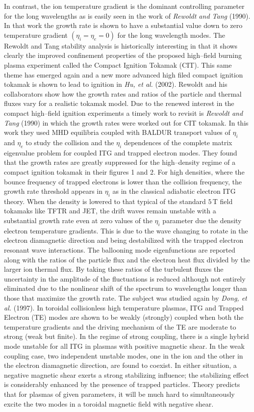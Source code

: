 \documentclass[a4paper,openany,12pt]{book}
\begin{document}
In contrast, the ion temperature gradient is the dominant controlling parameter for the long wavelengths as is easily seen in the work of \emph{Rewoldt and Tang} (1990). In that work the growth rate is shown to have a substantial value down to zero temperature gradient $(\eta_i=\eta_e=0)$ for the long wavelength modes. The Rewoldt and Tang stability analysis is historically interesting in that it shows clearly the improved confinement properties of the proposed high--field burning plasma experiment called the Compact Ignition Tokamak (CIT). This same theme has emerged again and a new more advanced high filed compact ignition tokamak is shown to lead to ignition in \emph{Hu, et al.} (2002). Rewoldt and his collaborators show how the growth rates and ratios of the particle and thermal fluxes vary for a realistic tokamak model. Due to the renewed interest in the compact high--field ignition experiments a timely work to revisit is \emph{Rewoldt and Tang} (1990) in which the growth rates were worked out for CIT tokamak. In this work they used MHD equilibria coupled with BALDUR transport values of $\eta_i$ and $\eta_e$ to study the collision and the $\eta_i$ dependences of the complete matrix eigenvalue problem for coupled ITG and trapped electron modes. They found that the growth rates are greatly suppressed for the high--density regime of a compact ignition tokamak in their figures 1 and 2. For high densities, where the bounce frequency of trapped electrons is lower than the collision frequency, the growth rate threshold appears in $\eta_i$ as in the classical adiabatic electron ITG theory. When the density is lowered to that typical of the standard 
$5\,$T field tokamaks like TFTR and JET, the drift waves remain unstable with a substantial growth rate even at zero values of the $\eta_i$ parameter due the density electron temperature gradients. This is due to the wave changing to rotate in the electron diamagnetic direction and being destabilized with the trapped electron resonant wave interactions. The ballooning mode eigenfunctions are reported along with the ratios of the particle flux and the electron heat flux divided by the larger ion thermal flux. By taking these ratios of the turbulent fluxes the uncertainty in the amplitude of the fluctuations is reduced although not entirely eliminated due to the nonlinear shift of the spectrum to wavelengths longer than those that maximize the growth rate. The subject was studied again by \emph{Dong, et al.} (1997). In toroidal collisionless high temperature plasmas, ITG and Trapped Electron (TE) modes are shown to be weakly (strongly) coupled when both the temperature gradients and the driving mechanism of the TE are moderate to strong (weak but finite). In the regime of strong coupling, there is a single hybrid mode unstable for all ITG in plasmas with positive magnetic shear. In the weak coupling case, two independent unstable modes, one in the ion and the other in the electron diamagnetic direction, are found to coexist. In either situation, a negative magnetic shear exerts a strong stabilizing influence; the stabilizing effect is considerably enhanced by the presence of trapped particles. Theory predicts that for plasmas of given parameters, it will be much hard to simultaneously excite the two modes in a toroidal magnetic field with negative shear.
\end{document}
